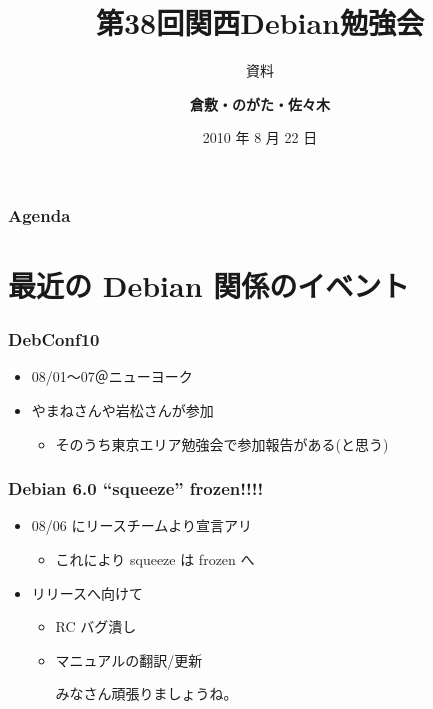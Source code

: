 \documentclass[cjk,dvipdfmx,12pt,%
hyperref={bookmarks=true,bookmarksnumbered=true,bookmarksopen=false,%
colorlinks=false,%
pdftitle={第38回関西Debian勉強会},%
pdfauthor={倉敷・のがた・佐々木},%
pdfsubject={資料},%
}]{beamer}
\title{第38回関西Debian勉強会}
\subtitle{{\scriptsize 資料}}
\author[佐々木 洋平]{{\large\bf 倉敷・のがた・佐々木}}
\institute[Debian JP]{{\normalsize\tt 関西Debian勉強会}}
\date{{\small 2010 年 8 月 22 日}}
\begin{document}
\settitleslide
\begin{frame}
\titlepage
\end{frame}
\setdefaultslide


\begin{frame}[fragile]
\frametitle{Agenda}

\tableofcontents

\end{frame}

\section{最近の Debian 関係のイベント}




\begin{frame}[fragile]
\frametitle{DebConf10}

\begin{itemize}
\item 08/01〜07＠ニューヨーク
\item やまねさんや岩松さんが参加

\begin{itemize}
\item そのうち東京エリア勉強会で参加報告がある(と思う)
\end{itemize}
\end{itemize}

\end{frame}




\begin{frame}[fragile]
\frametitle{Debian 6.0 ``squeeze'' frozen!!!!}

\begin{itemize}
\item 08/06 にリースチームより宣言アリ

\begin{itemize}
\item これにより squeeze は frozen へ
\end{itemize}
\item リリースへ向けて

\begin{itemize}
\item RC バグ潰し
\item マニュアルの翻訳/更新
\vspace{2em}
　
\begin{center}
みなさん頑張りましょうね。
\end{center}
\end{itemize}
\end{itemize}

\end{frame}
\end{document}
